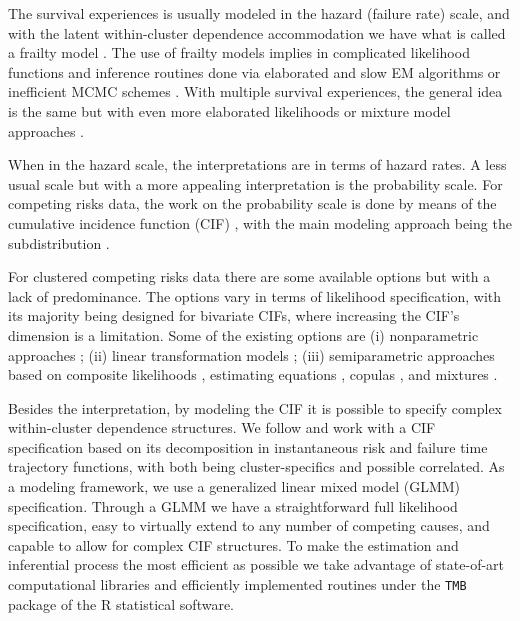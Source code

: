 \documentclass[a4paper,12pt]{article}
\begin{document}
The survival experiences is usually modeled in the hazard (failure rate)
scale, and with the latent within-cluster dependence accommodation we
have what is called a frailty model
\citep{frailty78,frailty79,liang95,petersen98}. The use of frailty
models implies in complicated likelihood functions and inference
routines done via elaborated and slow EM algorithms
\citep{nielsen92,klein92} or inefficient MCMC schemes
\citep{hougaard00}. With multiple survival experiences, the general idea
is the same but with even more elaborated likelihoods
\citep{prentice78,therneau00} or mixture model approaches
\citep{larson85,kuk92}.

When in the hazard scale, the interpretations are in terms of hazard
rates. A less usual scale but with a more appealing interpretation is
the probability scale. For competing risks data, the work on the
probability scale is done by means of the cumulative incidence function
(CIF) \citep{andersen12}, with the main modeling approach being the
subdistribution \citep{fine&gray}.

For clustered competing risks data there are some available options but
with a lack of predominance. The options vary in terms of likelihood
specification, with its majority being designed for bivariate CIFs,
where increasing the CIF's dimension is a limitation. Some of the
existing options are (i) nonparametric approaches
\citep{cheng07,cheng09}; (ii) linear transformation models
\citep{fine99,gerds12}; (iii) semiparametric approaches based on
composite likelihoods \citep{shih,SCHEIKE}, estimating equations
\citep{crossoddsratioSCHEIKE,cheng&fine}, copulas
\citep{semiparametricSCHEIKE}, and mixtures \citep{naskar05,shi13}.

Besides the interpretation, by modeling the CIF it is possible to
specify complex within-cluster dependence structures. We follow
\cite{SCHEIKE} and work with a CIF specification based on its
decomposition in instantaneous risk and failure time trajectory
functions, with both being cluster-specifics and possible correlated. As
a modeling framework, we use a generalized linear mixed model (GLMM)
specification. Through a GLMM we have a straightforward full likelihood
specification, easy to virtually extend to any number of competing
causes, and capable to allow for complex CIF structures. To make the
estimation and inferential process the most efficient as possible we
take advantage of state-of-art computational libraries and efficiently
implemented routines under the \texttt{TMB} \citep{TMB} package of the R
\citep{R21} statistical software.
\end{document}
